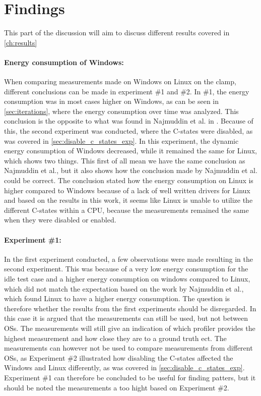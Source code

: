 \section{Findings}

This part of the discussion will aim to discuss different results covered in \cref{ch:results}

\paragraph*{Energy consumption of Windows:} When comparing measurements made on Windows on Linux on the clamp, different conclusions can be made in experiment \#1 and \#2. In \#1, the energy consumption was in most cases higher on Windows, as can be seen in \cref*{sec:iterations}, where the energy consumption over time was analyzed. This conclusion is the opposite to what was found in Najmuddin et al. in \cite*[]{Najmuddin2021}. Because of this, the second experiment was conducted, where the C-states were disabled, as was covered in \cref*{sec:disable_c_states_exp}. In this experiment, the dynamic energy consumption of Windows decreased, while it remained the same for Linux, which shows two things. This first of all mean we have the same conclusion as Najmuddin et al.\cite*[]{Najmuddin2021}, but it also shows how the conclusion made by Najmuddin et al.\cite*[]{Najmuddin2021} could be correct. The conclusion stated how the energy consumption on Linux is higher compared to Windows because of a lack of well written drivers for Linux and based on the results in this work, it seems like Linux is unable to utilize the different C-states within a CPU, because the measurements remained the same when they were disabled or enabled.

\paragraph*{Experiment \#1:} In the first experiment conducted, a few observations were made resulting in the second experiment. This was because of a very low energy consumption for the idle test case and a higher energy consumption on windows compared to Linux, which did not match the expectation based on the work by Najmuddin et al.\cite*[]{Najmuddin2021}, which found Linux to have a higher energy consumption. The question is therefore whether the results from the first experiments should be disregarded. In this case it is argued that the measurements can still be used, but not between OSs. The measurements will still give an indication of which profiler provides the highest measurement and how close they are to a ground truth ect. The measurements can however not be used to compare measurements from different OSs, as Experiment \#2 illustrated how disabling the C-states affected the Windows and Linux differently, as was covered in \cref{sec:disable_c_states_exp}. Experiment \#1 can therefore be concluded to be useful for finding patters, but it should be noted the measurements a too hight based on Experiment \#2.

